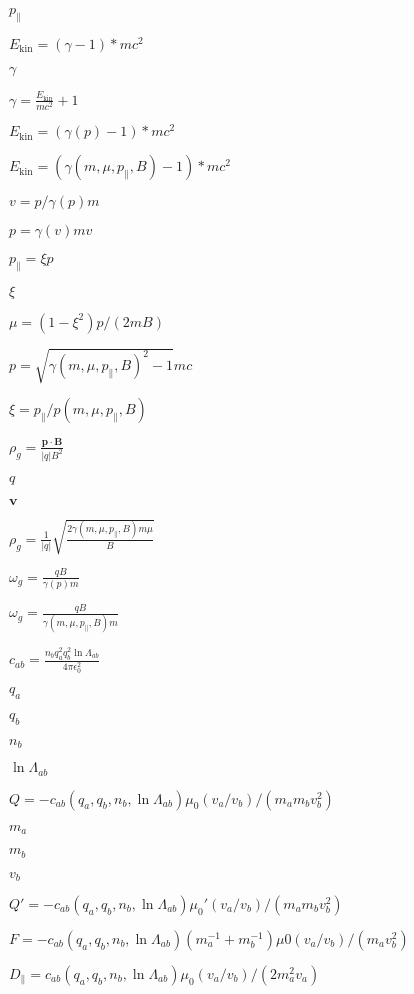 \documentclass{article}
\begin{document}
$p_\parallel$
\pagebreak

$E_\mathrm{kin}=(\gamma - 1) * m c^2$
\pagebreak

$\gamma$
\pagebreak

$\gamma = \frac{E_\mathrm{kin}}{m c^2} + 1$
\pagebreak

$E_\mathrm{kin}=(\gamma(p) - 1) * m c^2$
\pagebreak

$E_\mathrm{kin}=(\gamma(m, \mu, p_\parallel, B) - 1) * m c^2$
\pagebreak

$v = p/\gamma(p)m$
\pagebreak

$p = \gamma(v)mv$
\pagebreak

$p_\parallel = \xi p$
\pagebreak

$\xi$
\pagebreak

$\mu = (1-\xi^2)p/(2mB)$
\pagebreak

$p = \sqrt{\gamma(m,\mu,p_\parallel,B)^2 - 1} m c$
\pagebreak

$\xi = p_\parallel / p(m,\mu,p_\parallel,B) $
\pagebreak

$\rho_g = \frac{\mathbf{p}\cdot\mathbf{B}}{|q|B^2}$
\pagebreak

$q$
\pagebreak

$\mathbf{v}$
\pagebreak

$\rho_g = \frac{1}{|q|}\sqrt{\frac{2\gamma(m, \mu, p_\parallel, B) m \mu} {B}}$
\pagebreak

$\omega_g = \frac{q B}{\gamma(p) m}$
\pagebreak

$\omega_g = \frac{q B}{\gamma(m, \mu, p_\parallel, B) m}$
\pagebreak

$c_{ab} = \frac{n_b q_a^2q_b^2 \ln\Lambda_{ab}}{4\pi\epsilon_0^2}$
\pagebreak

$q_a$
\pagebreak

$q_b$
\pagebreak

$n_b$
\pagebreak

$\ln\Lambda_{ab}$
\pagebreak

$Q =-c_{ab}(q_a,q_b,n_b,\ln\Lambda_{ab})\mu_0(v_a/v_b) / (m_a m_b v_b^2)$
\pagebreak

$m_a$
\pagebreak

$m_b$
\pagebreak

$v_b$
\pagebreak

$Q'=-c_{ab}(q_a,q_b,n_b,\ln\Lambda_{ab})\mu_0'(v_a/v_b) / (m_a m_b v_b^2)$
\pagebreak

$F = -c_{ab}(q_a,q_b,n_b,\ln\Lambda_{ab})\left(m_a^{-1} + m_b^{-1}\right) \mu0(v_a/v_b) / (m_a v_b^2)$
\pagebreak

$D_\parallel=c_{ab}(q_a,q_b,n_b,\ln\Lambda_{ab})\mu_0(v_a/v_b) /(2m_a^2v_a)$
\pagebreak
\end{document}
